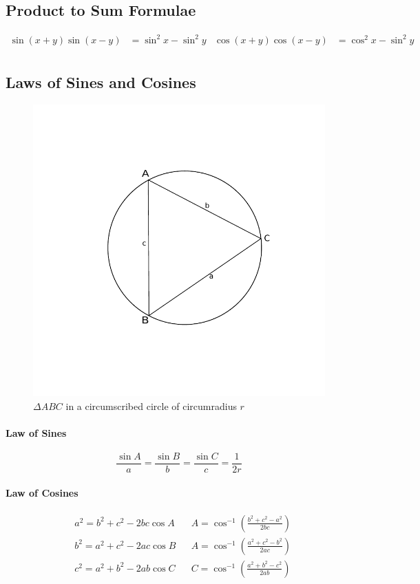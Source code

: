 \documentclass[12pt]{article}
\begin{document}
\subsection{Product to Sum Formulae}
\begin{align*}
\sin(x + y) \sin(x - y) &= \sin^2x - \sin^2y &
\cos(x + y) \cos(x - y) &=\cos^2x - \sin^2y \\
\end{align*}
\subsection{Laws of Sines and Cosines}
\begin{figure}[H]
	\centering
	\includegraphics[scale=1]{figures/triangle}
	\caption{\label{triangle}$\Delta ABC$ in a circumscribed circle of circumradius $r$}
\end{figure}
\paragraph{Law of Sines}
$$\frac{\sin A}{a} = \frac{\sin B}{b} = \frac{\sin C}{c} = \frac{1}{2r}$$ 
\paragraph{Law of Cosines}
\begin{align*}
&a^2 = b^2 + c^2 - 2bc\cos A & &A =\cos^{-1}{\left(\frac{b^2 + c^2 - a^2}{2bc}\right)} \\
&b^2 = a^2 + c^2 - 2ac\cos B & &A =\cos^{-1}{\left(\frac{a^2 + c^2 - b^2}{2ac}\right)} \\
&c^2 = a^2 + b^2 - 2ab\cos C & &C =\cos^{-1}{\left(\frac{a^2 + b^2 - c^2}{2ab}\right)} \\
\end{align*}
\end{document}
